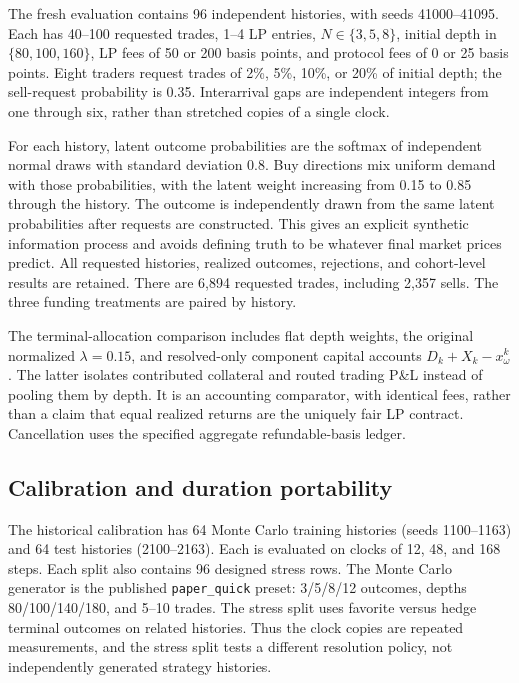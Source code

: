 \documentclass[10pt]{article}
\begin{document}
The fresh evaluation contains 96 independent histories, with seeds 41000--41095. Each has 40--100 requested trades, 1--4 LP entries, $N\in\{3,5,8\}$, initial depth in $\{80,100,160\}$, LP fees of 50 or 200 basis points, and protocol fees of 0 or 25 basis points. Eight traders request trades of 2\%, 5\%, 10\%, or 20\% of initial depth; the sell-request probability is 0.35. Interarrival gaps are independent integers from one through six, rather than stretched copies of a single clock.

For each history, latent outcome probabilities are the softmax of independent normal draws with standard deviation 0.8. Buy directions mix uniform demand with those probabilities, with the latent weight increasing from 0.15 to 0.85 through the history. The outcome is independently drawn from the same latent probabilities after requests are constructed. This gives an explicit synthetic information process and avoids defining truth to be whatever final market prices predict. All requested histories, realized outcomes, rejections, and cohort-level results are retained. There are 6,894 requested trades, including 2,357 sells. The three funding treatments are paired by history.

The terminal-allocation comparison includes flat depth weights, the original normalized $\lambda=0.15$, and resolved-only component capital accounts $D_k+X_k-x^k_\omega$. The latter isolates contributed collateral and routed trading P\&L instead of pooling them by depth. It is an accounting comparator, with identical fees, rather than a claim that equal realized returns are the uniquely fair LP contract. Cancellation uses the specified aggregate refundable-basis ledger.

\subsection{Calibration and duration portability}

The historical calibration has 64 Monte Carlo training histories (seeds 1100--1163) and 64 test histories (2100--2163). Each is evaluated on clocks of 12, 48, and 168 steps. Each split also contains 96 designed stress rows. The Monte Carlo generator is the published \texttt{paper\_quick} preset: 3/5/8/12 outcomes, depths 80/100/140/180, and 5--10 trades. The stress split uses favorite versus hedge terminal outcomes on related histories. Thus the clock copies are repeated measurements, and the stress split tests a different resolution policy, not independently generated strategy histories.
\end{document}
